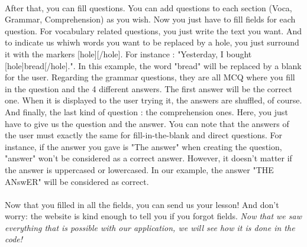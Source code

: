 \paragraph{}
After that, you can fill questions. You can add questions to each section (Voca, Grammar, Comprehension) as you wish. Now you just have to fill fields for each question. \linebreak
For vocabulary related questions, you just write the text you want. And to indicate us whiwh words you want to be replaced by a hole, you just surround it with the markers [hole][/hole]. For instance : "Yesterday, I bought [hole]bread[/hole].". In this example, the word "bread" will be replaced by a blank for the user. \linebreak
Regarding the grammar questions, they are all MCQ where you fill in the question and the 4 different answers. The first answer will be the correct one. When it is displayed to the user trying it, the answers are shuffled, of course. \linebreak
And finally, the last kind of question : the comprehension ones. Here, you just have to give us the question and the answer. \linebreak
You can note that the answers of the user must exactly the same for fill-in-the-blank and direct questions. For instance, if the answer you gave is "The answer" when creating the question, "answer" won't be considered as a correct answer. However, it doesn't matter if the answer is uppercased or lowercased. In our example, the answer "THE ANswER" will be considered as correct.

\paragraph{}
Now that you filled in all the fields, you can send us your lesson! And don't worry: the website is kind enough to tell you if you forgot fields. \linebreak
\emph{Now that we saw everything that is possible with our application, we will see how it is done in the code!}


